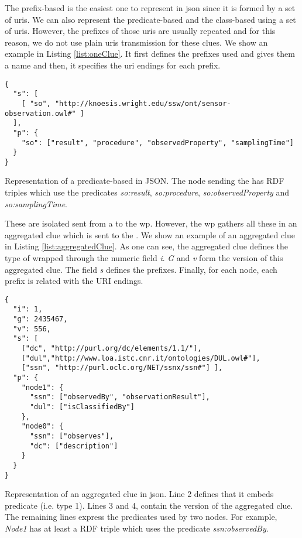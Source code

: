 The prefix-based \clue{} is the easiest one to represent in \ac{json} since it is formed by a set of \acp{uri}.
We can also represent the predicate-based and the class-based \clues{} using a set of \acp{uri}.
However, the prefixes of those \acp{uri} are usually repeated and for this reason, we do not use plain \acp{uri} transmission for these clues.
We show an example in Listing \ref{list:oneClue}.
It first defines the prefixes used and gives them a name and then, it specifies the \ac{uri} endings for each prefix.

\begin{listing}
  \begin{verbatim}
{
  "s": [
    [ "so", "http://knoesis.wright.edu/ssw/ont/sensor-observation.owl#" ]
  ],
  "p": {
    "so": ["result", "procedure", "observedProperty", "samplingTime"]
  }
}
  \end{verbatim}
  \caption{
    Representation of a predicate-based \clue{} in JSON.
    The node sending the \clue{} has RDF triples which use the predicates
    \emph{so:result}, \emph{so:procedure}, \emph{so:observedProperty} and \emph{so:samplingTime}.
  }
  \label{list:oneClue}
\end{listing}

\medskip

These are isolated \clues{} sent from a \provider{} to the \ac{wp}.
However, the \ac{wp} gathers all these \clues{} in an aggregated clue which is sent to the \consumer{}.
We show an example of an aggregated clue in Listing \ref{list:aggregatedClue}.
As one can see, the aggregated clue defines the type of \clues{} wrapped through the numeric field \emph{i}.
\emph{G} and \emph{v} form the version of this aggregated clue.
The field \emph{s} defines the prefixes.
Finally, for each node, each prefix is related with the URI endings.

\begin{listing}
  \begin{verbatim}
{
  "i": 1,
  "g": 2435467,
  "v": 556,
  "s": [
    ["dc", "http://purl.org/dc/elements/1.1/"],
    ["dul","http://www.loa.istc.cnr.it/ontologies/DUL.owl#"],
    ["ssn", "http://purl.oclc.org/NET/ssnx/ssn#"] ],
  "p": {
    "node1": {
      "ssn": ["observedBy", "observationResult"],
      "dul": ["isClassifiedBy"]
    },
    "node0": {
      "ssn": ["observes"],
      "dc": ["description"]
    }
  }
}
  \end{verbatim}
  \caption{
    Representation of an aggregated clue in \ac{json}.
    Line 2 defines that it embeds predicate \clues{} (i.e. type 1).
    Lines 3 and 4, contain the version of the aggregated clue.
    The remaining lines express the predicates used by two nodes.
    For example, \emph{Node1} has at least a RDF triple which uses the predicate \emph{ssn:observedBy}.
  }
  \label{list:aggregatedClue}
\end{listing}

